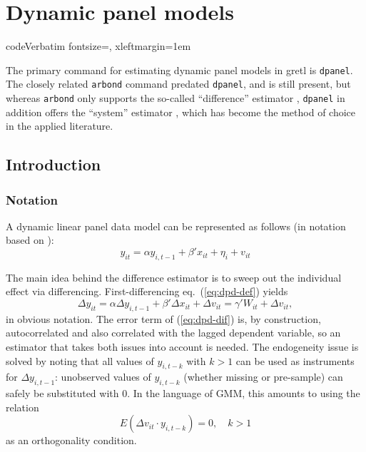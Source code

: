 \chapter{Dynamic panel models}
\label{chap:dpanel}

\newcommand{\by}{\boldsymbol{y}}
\newcommand{\bx}{\boldsymbol{x}}
\newcommand{\bv}{\boldsymbol{v}}
\newcommand{\bX}{\boldsymbol{X}}
\newcommand{\bW}{\boldsymbol{W}}
\newcommand{\bZ}{\boldsymbol{Z}}
\newcommand{\bA}{\boldsymbol{A}}
\newcommand{\biota}{\bm{\iota}}

\DefineVerbatimEnvironment%
{code}{Verbatim}
{fontsize=\small, xleftmargin=1em}

\newenvironment%
{altcode}%
{\vspace{1ex}\small\leftmargin 1em}{\vspace{1ex}}

The primary command for estimating dynamic panel models in gretl is
\texttt{dpanel}. The closely related \texttt{arbond} command predated
\texttt{dpanel}, and is still present, but whereas \texttt{arbond}
only supports the so-called ``difference'' estimator
\citep{arellano-bond91}, \texttt{dpanel} in addition offers the
``system'' estimator \citep{blundell-bond98}, which has become the
method of choice in the applied literature.

\section{Introduction}
\label{sec:dpanel-intro}

\subsection{Notation}
\label{sec:dpanel-notation}

A dynamic linear panel data model can be represented as follows
(in notation based on \cite{arellano03}):
\begin{equation}
  \label{eq:dpd-def}
  y_{it} = \alpha y_{i,t-1} + \beta'x_{it} + \eta_{i} + v_{it}
\end{equation}

The main idea behind the difference estimator is to sweep out the
individual effect via differencing.  First-differencing eq.\
(\ref{eq:dpd-def}) yields
\begin{equation}
  \label{eq:dpd-dif}
  \Delta y_{it} = \alpha \Delta y_{i,t-1} + \beta'\Delta x_{it} +
  \Delta v_{it} = \gamma' W_{it} + \Delta v_{it} ,
\end{equation}
in obvious notation. The error term of (\ref{eq:dpd-dif}) is, by
construction, autocorrelated and also correlated with the lagged
dependent variable, so an estimator that takes both issues into
account is needed. The endogeneity issue is solved by noting that all
values of $y_{i,t-k}$ with $k>1$ can be used as instruments for
$\Delta y_{i,t-1}$: unobserved values of $y_{i,t-k}$ (whether missing
or pre-sample) can safely be substituted with 0. In the language of
GMM, this amounts to using the relation
\begin{equation}
  \label{eq:OC-dif}
  E(\Delta v_{it} \cdot y_{i,t-k}) = 0, \quad k>1
\end{equation}
as an orthogonality condition.

